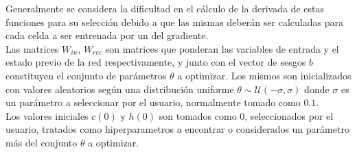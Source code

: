 \documentclass{article}
\begin{document}
	Generalmente se considera la dificultad en el cálculo de la derivada de estas funciones para su selección debido a que las mismas deberán ser calculadas para cada celda a ser entrenada por un del gradiente.\\
	Las matrices $W_{in}$, $W_{rec}$ son matrices que ponderan las variables de entrada y el estado previo de la red respectivamente, y junto con el vector de sesgos $b$ constituyen el conjunto de parámetros $\theta$ a optimizar. Los mismos son inicializados con valores aleatorios según una distribución uniforme $\theta \sim \mathcal{U}(-\sigma, \sigma)$ donde $\sigma$ es un parámetro a seleccionar por el usuario, normalmente tomado como $0.1$.\\
	Los valores iniciales $c(0)$ y $h(0)$ son tomados como $0$, seleccionados por el usuario, tratados como hiperparametros a encontrar o considerados un parámetro más del conjunto $\theta$ a optimizar.\\
	
\end{document}
